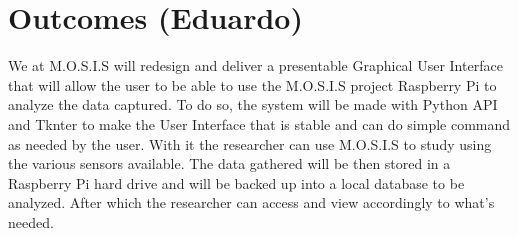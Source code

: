 \section{Outcomes (Eduardo)}
We at M.O.S.I.S will redesign and deliver a presentable Graphical User Interface that will allow the user to be able to use the M.O.S.I.S project Raspberry Pi to analyze the data captured. To do so, the system will be made with Python API and Tknter to make the User Interface that is stable and can do simple command as needed by the user. 
With it the researcher can use M.O.S.I.S to study using the various sensors available. The data gathered will be then stored in a Raspberry Pi hard drive and will be backed up into a local database to be analyzed. After which the researcher can access and view accordingly to what's needed.